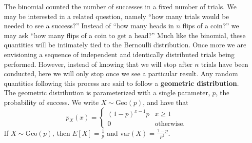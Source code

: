 \documentclass[
  letterpaper,
  DIV=11,
  numbers=noendperiod]{scrreprt}
\theoremstyle{definition}
\theoremstyle{definition}
\theoremstyle{definition}
\theoremstyle{remark}
\begin{document}
The binomial counted the number of successes in a fixed number of
trials. We may be interested in a related question, namely ``how many
trials would be needed to see a success?'' Instead of ``how many heads
in \(n\) flips of a coin?'' we may ask ``how many flips of a coin to get
a head?'' Much like the binomial, these quantities will be intimately
tied to the Bernoulli distribution. Once more we are envisioning a
sequence of independent and identically distributed trials being
performed. However, instead of knowing that we will stop after \(n\)
trials have been conducted, here we will only stop once we see a
particular result. Any random quantities following this process are said
to follow a \textbf{geometric distribution}. The geometric distribution
is parameterized with a single parameter, \(p\), the probability of
success. We write \(X\sim\text{Geo}(p)\), and have that
\[p_X(x) = \begin{cases}(1-p)^{x-1}p & x \geq 1 \\  0 & \text{otherwise}.\end{cases}\]
If \(X\sim\text{Geo}(p)\), then \(E[X] = \frac{1}{p}\) and
\(\text{var}(X) = \frac{1-p}{p^2}\).
\end{document}
